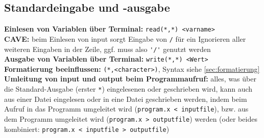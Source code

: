 \documentclass[a4paper, twocolumn]{scrarticle}
\begin{document}
\subsection{Standardeingabe und -ausgabe}
\textbf{Einlesen von Variablen über Terminal:} \lstinline|read(*,*) <varname>|\\
\textbf{CAVE:} beim Einlesen von input sorgt Eingabe von \lstinline|/| für ein Ignorieren aller weiteren Eingaben in der Zeile, ggf. muss also \lstinline|'/'| genutzt werden\\
\textbf{Ausgabe von Variablen über Terminal:} \lstinline|write(*,*) <Wert>|\\
\textbf{Formatierung beeinflussen:} \lstinline|(*,<character>)|, Syntax siehe \cref{sec:formatierung}\\
\textbf{Umleitung von input und output beim Programmaufruf:} alles, was über die Standard-Ausgabe (erster \lstinline|*|) eingelesenen oder geschrieben wird, kann auch aus einer Datei eingelesen oder in eine Datei geschrieben werden, indem beim Aufruf in das Programm umgeleitet wird (\lstinline[style=neutral]|program.x < inputfile|), bzw. aus dem Programm umgeleitet wird (\lstinline[style=neutral]|program.x > outputfile|) werden (oder beides kombiniert: \lstinline[style=neutral]|program.x < inputfile > outputfile|)
\end{document}
